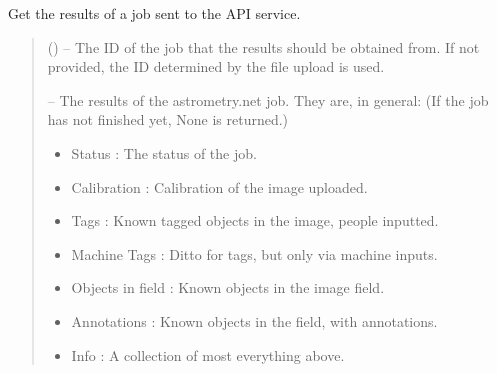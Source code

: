\documentclass[letterpaper,11pt,english]{sphinxmanual}
\begin{document}
\begin{savenotes}
\begin{fulllineitems}
\begin{savenotes}\begin{fulllineitems}
\label{\detokenize{code/opihiexarata.astrometry.webclient:opihiexarata.astrometry.webclient.AstrometryNetWebAPIEngine.get_job_results}}
\pysigstartsignatures
{}
\pysigstopsignatures
\sphinxAtStartPar
Get the results of a job sent to the API service.
\begin{quote}\begin{description}
\sphinxAtStartPar
{} (\sphinxstyleliteralemphasis{\sphinxupquote{, }}) – The ID of the job that the results should be obtained from. If not
provided, the ID determined by the file upload is used.

\sphinxAtStartPar

\sphinxAtStartPar
{} – The results of the astrometry.net job. They are, in general: (If
the job has not finished yet, None is returned.)
\begin{itemize}
\item {} 
\sphinxAtStartPar
Status : The status of the job.

\item {} 
\sphinxAtStartPar
Calibration : Calibration of the image uploaded.

\item {} 
\sphinxAtStartPar
Tags : Known tagged objects in the image, people inputted.

\item {} 
\sphinxAtStartPar
Machine Tags : Ditto for tags, but only via machine inputs.

\item {} 
\sphinxAtStartPar
Objects in field : Known objects in the image field.

\item {} 
\sphinxAtStartPar
Annotations : Known objects in the field, with annotations.

\item {} 
\sphinxAtStartPar
Info : A collection of most everything above.


\end{itemize}
\end{description}
\end{quote}
\end{fulllineitems}
\end{savenotes}
\end{fulllineitems}
\end{savenotes}
\end{document}
